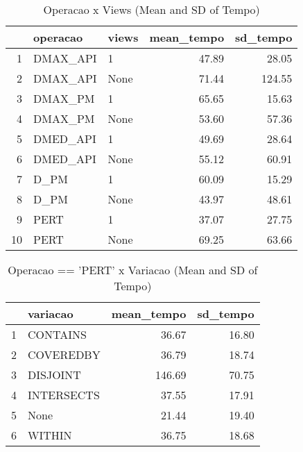 \begin{table}[ht]
\centering
\begin{tabular}{rllrr}
  \hline
 & operacao & views & mean\_tempo & sd\_tempo \\ 
  \hline
1 & DMAX\_API & 1 & 47.89 & 28.05 \\ 
  2 & DMAX\_API & None & 71.44 & 124.55 \\ 
  3 & DMAX\_PM & 1 & 65.65 & 15.63 \\ 
  4 & DMAX\_PM & None & 53.60 & 57.36 \\ 
  5 & DMED\_API & 1 & 49.69 & 28.64 \\ 
  6 & DMED\_API & None & 55.12 & 60.91 \\ 
  7 & D\_PM & 1 & 60.09 & 15.29 \\ 
  8 & D\_PM & None & 43.97 & 48.61 \\ 
  9 & PERT & 1 & 37.07 & 27.75 \\ 
  10 & PERT & None & 69.25 & 63.66 \\ 
   \hline
\end{tabular}
\caption{Operacao x Views (Mean and SD of Tempo)} 
\end{table}


\begin{table}[ht]
\centering
\begin{tabular}{rlrr}
  \hline
 & variacao & mean\_tempo & sd\_tempo \\ 
  \hline
1 & CONTAINS & 36.67 & 16.80 \\ 
  2 & COVEREDBY & 36.79 & 18.74 \\ 
  3 & DISJOINT & 146.69 & 70.75 \\ 
  4 & INTERSECTS & 37.55 & 17.91 \\ 
  5 & None & 21.44 & 19.40 \\ 
  6 & WITHIN & 36.75 & 18.68 \\ 
   \hline
\end{tabular}
\caption{Operacao == 'PERT' x Variacao (Mean and SD of Tempo)} 
\end{table}